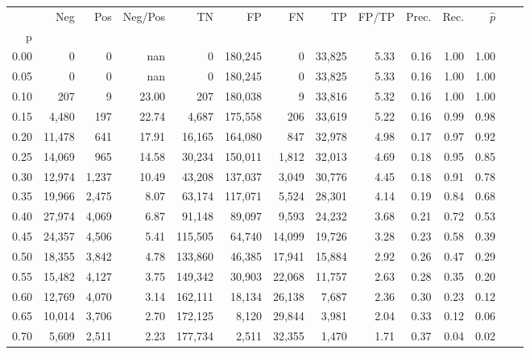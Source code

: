 \begin{tabular}{rrrrrrrrrrrrrr}
\toprule
{} &     Neg &    Pos & Neg/Pos &       TN &       FP &      FN &      TP & FP/TP & Prec. &  Rec. & $\hat{p}$ \\
p    &         &        &         &          &          &         &         &       &       &       &           \\
\midrule
0.00 &       0 &      0 &     nan &        0 &  180,245 &       0 &  33,825 &  5.33 &  0.16 &  1.00 &      1.00 \\
0.05 &       0 &      0 &     nan &        0 &  180,245 &       0 &  33,825 &  5.33 &  0.16 &  1.00 &      1.00 \\
0.10 &     207 &      9 &   23.00 &      207 &  180,038 &       9 &  33,816 &  5.32 &  0.16 &  1.00 &      1.00 \\
0.15 &   4,480 &    197 &   22.74 &    4,687 &  175,558 &     206 &  33,619 &  5.22 &  0.16 &  0.99 &      0.98 \\
0.20 &  11,478 &    641 &   17.91 &   16,165 &  164,080 &     847 &  32,978 &  4.98 &  0.17 &  0.97 &      0.92 \\
0.25 &  14,069 &    965 &   14.58 &   30,234 &  150,011 &   1,812 &  32,013 &  4.69 &  0.18 &  0.95 &      0.85 \\
0.30 &  12,974 &  1,237 &   10.49 &   43,208 &  137,037 &   3,049 &  30,776 &  4.45 &  0.18 &  0.91 &      0.78 \\
0.35 &  19,966 &  2,475 &    8.07 &   63,174 &  117,071 &   5,524 &  28,301 &  4.14 &  0.19 &  0.84 &      0.68 \\
0.40 &  27,974 &  4,069 &    6.87 &   91,148 &   89,097 &   9,593 &  24,232 &  3.68 &  0.21 &  0.72 &      0.53 \\
0.45 &  24,357 &  4,506 &    5.41 &  115,505 &   64,740 &  14,099 &  19,726 &  3.28 &  0.23 &  0.58 &      0.39 \\
0.50 &  18,355 &  3,842 &    4.78 &  133,860 &   46,385 &  17,941 &  15,884 &  2.92 &  0.26 &  0.47 &      0.29 \\
0.55 &  15,482 &  4,127 &    3.75 &  149,342 &   30,903 &  22,068 &  11,757 &  2.63 &  0.28 &  0.35 &      0.20 \\
0.60 &  12,769 &  4,070 &    3.14 &  162,111 &   18,134 &  26,138 &   7,687 &  2.36 &  0.30 &  0.23 &      0.12 \\
0.65 &  10,014 &  3,706 &    2.70 &  172,125 &    8,120 &  29,844 &   3,981 &  2.04 &  0.33 &  0.12 &      0.06 \\
0.70 &   5,609 &  2,511 &    2.23 &  177,734 &    2,511 &  32,355 &   1,470 &  1.71 &  0.37 &  0.04 &      0.02 \\

\end{tabular}
